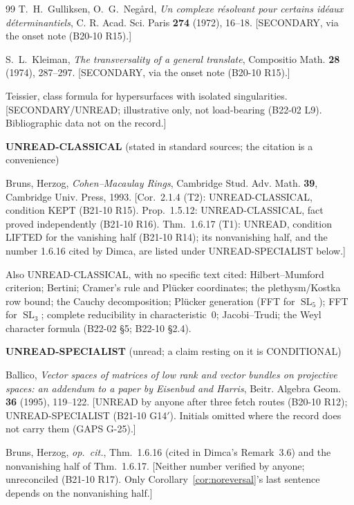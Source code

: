 \documentclass[11pt]{amsart}
\theoremstyle{plain}
\theoremstyle{definition}
\theoremstyle{remark}
\DeclareMathOperator{\SL}{SL}
\begin{document}
\begin{thebibliography}{99}
 T.~H.~Gulliksen, O.~G.~Neg\aa rd, \emph{Un complexe r\'esolvant pour certains
id\'eaux d\'eterminantiels}, C. R. Acad. Sci. Paris \textbf{274} (1972), 16--18. [SECONDARY, via the
onset note (B20-10 R15).]

 S.~L.~Kleiman, \emph{The transversality of a general translate}, Compositio
Math. \textbf{28} (1974), 287--297. [SECONDARY, via the onset note (B20-10 R15).]

 Teissier, class formula for hypersurfaces with isolated singularities.
[SECONDARY/UNREAD; illustrative only, not load-bearing (B22-02 L9). Bibliographic data not on the
record.]

\item[] \textbf{UNREAD-CLASSICAL} (stated in standard sources; the citation is a convenience)

 Bruns, Herzog, \emph{Cohen--Macaulay Rings}, Cambridge Stud. Adv. Math.
\textbf{39}, Cambridge Univ. Press, 1993. [Cor.~2.1.4 (T2): UNREAD-CLASSICAL, condition KEPT
(B21-10 R15). Prop.~1.5.12: UNREAD-CLASSICAL, fact proved independently (B21-10 R16). Thm.~1.6.17
(T1): UNREAD, condition LIFTED for the vanishing half (B21-10 R14); its nonvanishing half, and the
number 1.6.16 cited by Dimca, are listed under UNREAD-SPECIALIST below.]

\item[] Also UNREAD-CLASSICAL, with no specific text cited: Hilbert--Mumford criterion;
Bertini; Cramer's rule and Pl\"ucker coordinates; the plethysm/Kostka row bound; the Cauchy
decomposition; Pl\"ucker generation (FFT for $\SL_5$); FFT for $\SL_3$; complete reducibility in
characteristic~$0$; Jacobi--Trudi; the Weyl character formula (B22-02 \S5; B22-10 \S2.4).

\item[] \textbf{UNREAD-SPECIALIST} (unread; a claim resting on it is CONDITIONAL)

 Ballico, \emph{Vector spaces of matrices of low rank and vector bundles on
projective spaces: an addendum to a paper by Eisenbud and Harris}, Beitr. Algebra Geom. \textbf{36}
(1995), 119--122. [UNREAD by anyone after three fetch routes (B20-10 R12); UNREAD-SPECIALIST
(B21-10 G14$'$). Initials omitted where the record does not carry them (GAPS G-25).]

 Bruns, Herzog, \emph{op.\ cit.}, Thm.~1.6.16 (cited in Dimca's Remark~3.6)
and the nonvanishing half of Thm.~1.6.17. [Neither number verified by anyone; unreconciled
(B21-10 R17). Only Corollary~\ref{cor:noreversal}'s last sentence depends on the nonvanishing
half.]


\end{thebibliography}
\end{document}
